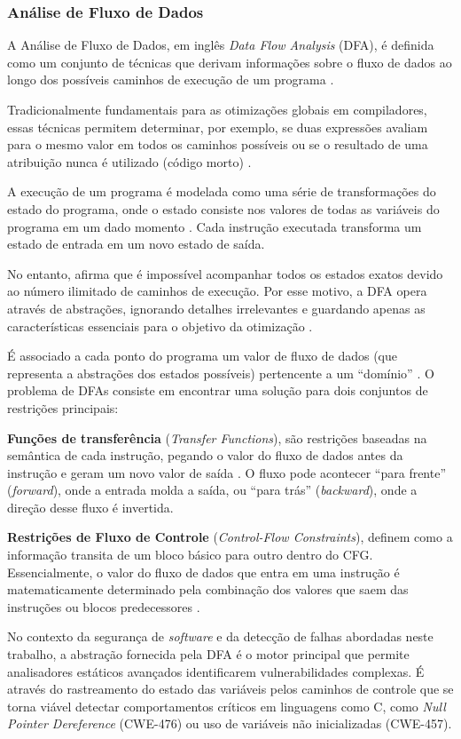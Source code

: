 \documentclass[
    12pt,                %
    openright,           %
    oneside,             %
    a4paper,             %
    english,             %
    brazil               %
]{abntex2}
\begin{document}
\begin{itemize}
\subsubsection{Análise de Fluxo de Dados}
\label{sec:analisefluxo}
\par
A Análise de Fluxo de Dados, em inglês \textit{Data Flow Analysis} (DFA), é definida como um conjunto de técnicas que derivam informações sobre o fluxo de dados ao longo dos possíveis caminhos de execução de um programa \cite{aho2007compilers}.
\par
Tradicionalmente fundamentais para as otimizações globais em compiladores, essas técnicas permitem determinar, por exemplo, se duas expressões avaliam para o mesmo valor em todos os caminhos possíveis ou se o resultado de uma atribuição nunca é utilizado (código morto) \cite{aho2007compilers}.
\par
A execução de um programa é modelada como uma série de transformações do estado do programa, onde o estado consiste nos valores de todas as variáveis do programa em um dado momento \cite{aho2007compilers}.
Cada instrução executada transforma um estado de entrada em um novo estado de saída.
\par
No entanto,  afirma que é impossível acompanhar todos os estados exatos devido ao número ilimitado de caminhos de execução.
Por esse motivo, a DFA opera através de abstrações, ignorando detalhes irrelevantes e guardando apenas as características essenciais para o objetivo da otimização \cite{aho2007compilers}.
\par
É associado a cada ponto do programa um valor de fluxo de dados (que representa a abstrações dos estados possíveis) pertencente a um ``domínio'' \cite{aho2007compilers}.
O problema de DFAs consiste em encontrar uma solução para dois conjuntos de restrições principais:
\par
\textbf{Funções de transferência} (\textit{Transfer Functions}), são restrições baseadas na semântica de cada instrução, pegando o valor do fluxo de dados antes da instrução e geram um novo valor de saída \cite{aho2007compilers}.
O fluxo pode acontecer ``para frente'' (\textit{forward}), onde a entrada molda a saída, ou ``para trás'' (\textit{backward}), onde a direção desse fluxo é invertida.
\par
\textbf{Restrições de Fluxo de Controle} (\textit{Control-Flow Constraints}), definem como a informação transita de um bloco básico para outro dentro do CFG. 
Essencialmente, o valor do fluxo de dados que entra em uma instrução é matematicamente determinado pela combinação dos valores que saem das instruções ou blocos predecessores \cite{aho2007compilers}.
\par
No contexto da segurança de \textit{software} e da detecção de falhas abordadas neste trabalho, a abstração fornecida pela DFA é o motor principal que permite analisadores estáticos avançados identificarem vulnerabilidades complexas.
É através do rastreamento do estado das variáveis pelos caminhos de controle que se torna viável detectar comportamentos críticos em linguagens como C, como \textit{Null Pointer Dereference} (CWE-476) ou uso de variáveis não inicializadas (CWE-457).


\end{itemize}
\end{document}
